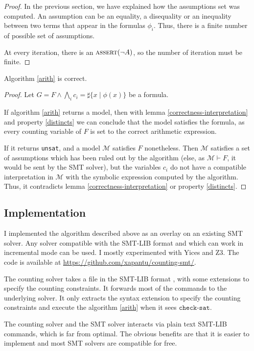 \begin{proof}
In the previous section, we have explained how the assumptions set was computed. An
assumption can be an equality, a disequality or an inequality between two terms
that appear in the formulas $\phi_i$. Thus, there is a finite number of possible
set of assumptions.

At every iteration, there is an $\text{\textsc{assert}}(\lnot A)$, so the number
of iteration must be finite.
\end{proof}

\begin{lemma}[Correctness]

Algorithm \ref{arith} is correct.
\end{lemma}

\begin{proof}
Let $G = F \land \bigwedge\limits_{i} c_i = \sharp\{x\mid\phi(x)\}$ be a formula.

If algorithm \ref{arith} returns a model, then with lemma \ref{correctness-interpretation} and property
\ref{distincts} we can conclude that the model satisfies the formula, as every counting variable of
$F$ is set to the correct arithmetic expression.

If it returns \texttt{unsat}, and a model $\mathcal{M}$ satisfies $F$ nonetheless. Then $\mathcal{M}$
satisfies a set of assumptions which has been ruled out by the algorithm (else, as $\mathcal{M}
\vdash F$, it would be sent by the SMT solver), but the variables $c_i$ do not have a compatible
interpretation in $\mathcal{M}$ with the symbolic expression computed by the algorithm. Thus, it
contradicts lemma \ref{correctness-interpretation} or property \ref{distincts}.
\end{proof}

\subsection{Implementation}

I implemented the algorithm described above as an overlay on an existing SMT solver. Any solver
compatible with the SMT-LIB format \cite{barrett2010smt} and which can work in incremental mode can
be used. I mostly experimented with Yices and Z3. The code is available at
\url{https://github.com/xapantu/counting-smt/}.

The counting solver takes a file in the SMT-LIB format \cite{barrett2010smt}, with some extensions
to specify the counting constraints. It forwards most of the commands to the underlying solver. It only
extracts the syntax extension to specify the counting constraints and execute the algorithm \ref{arith}
when it sees $\texttt{check-sat}$.

The counting solver and the SMT solver interacts via plain text SMT-LIB  commands, which is far from
optimal. The obvious benefits are that it is easier to implement and most SMT solvers are compatible
for free.

